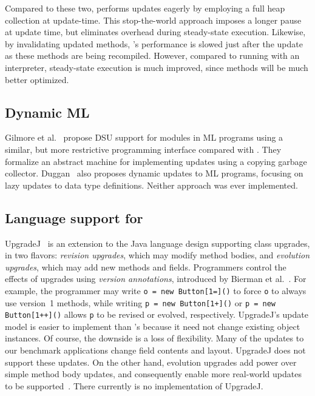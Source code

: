 Compared to these two, \JV performs updates eagerly by employing a full
heap collection at update-time.  This stop-the-world approach imposes a
longer pause at update time, but eliminates overhead during steady-state
execution.  Likewise, by invalidating updated methods, \JV's performance is
slowed just after the update as these methods are being recompiled.
However, compared to running with an interpreter, steady-state execution is
much improved, since methods will be much better optimized.

\subsection{Dynamic ML}

Gilmore et al.~\cite{GilmoreKW97} propose DSU support for modules in ML
programs using a similar, but more restrictive programming interface
compared with \JV.  They formalize an abstract machine for implementing
updates using a copying garbage collector.
Duggan~\cite{DBLP:journals/acta/Duggan05} also proposes dynamic updates to
ML programs, focusing on lazy updates to data type definitions.  Neither
approach was ever implemented.

\subsection{Language support for \USD}

UpgradeJ~\cite{bierman08upgradej} is an extension to the Java language
design supporting class upgrades, in two flavors: \emph{revision upgrades},
which may modify method bodies, and \emph{evolution upgrades}, which may
add new methods and fields.  Programmers control the effects of upgrades
using \emph{version annotations}, introduced by Bierman et
al.~\cite{BiermanHSS03}.  For example, the programmer may
write \texttt{o = new Button[1=]()} to force \texttt{o} to always use
version~1 methods, while writing \texttt{p = new Button[1+]()} or \texttt{p
= new Button[1++]()} allows \texttt{p} to be revised or evolved,
respectively.  UpgradeJ's update model is easier to implement than \JV's
because it need not change existing object instances.  Of course, the
downside is a loss of flexibility.  Many of the updates to our benchmark
applications change field contents and layout.  UpgradeJ does not support
these updates.  On the other hand, evolution upgrades add power over simple
method body updates, and consequently enable more real-world updates to be
supported~\cite{tempero08upgradej}.  There currently is no implementation of
UpgradeJ.

